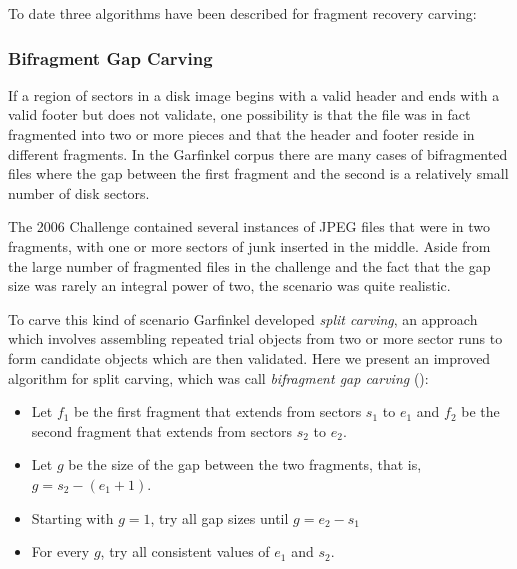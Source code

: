 \documentclass[11pt,letter]{article}
\begin{document}


To date three algorithms have been described for fragment recovery
carving:

\subsubsection{Bifragment Gap Carving}\label{gap-carving}

If a region of sectors in a disk image begins with a valid header and
ends with a valid footer but does not validate, one possibility is
that the file was in fact fragmented into two or more pieces
and that the header and footer reside in different fragments.
In the Garfinkel corpus there are 
many cases of bifragmented files where the gap between the first
fragment and the second is a relatively small number of
disk sectors. 

The 2006 Challenge contained several instances of JPEG files that
were in two fragments, with one or more sectors of junk inserted in
the middle. Aside from the large number of fragmented files in the
challenge and the fact that the gap size was rarely an integral power of
two, the scenario was quite realistic. 

To carve this kind of scenario Garfinkel developed \emph{split
carving}, an approach which involves assembling repeated trial
objects from two or more sector runs to form candidate objects which
are then validated. Here we present an improved algorithm for split carving, which
was call \emph{bifragment gap carving} ():

\begin{itemize}
\item 
Let $f_1$ be the first fragment that extends
from sectors $s_1$ to $e_1$ and $f_2$ be the second fragment that
extends from sectors $s_2$ to $e_2$. 
\item Let $g$ be the size of the gap between the two fragments, that
  is, $g=s_2-(e_1+1)$.
\item Starting with $g=1$, try all gap sizes until $g=e_2-s_1$
\item For every $g$, try all consistent values of $e_1$ and $s_2$. 
\end{itemize}
\end{document}

